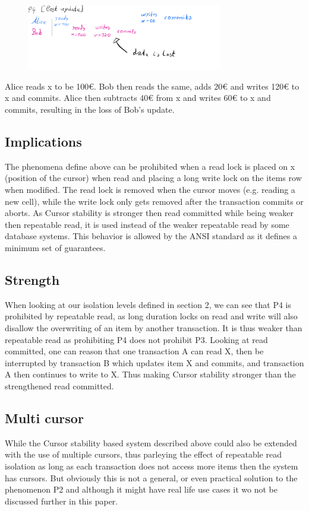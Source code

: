 \documentclass[sigconf, review=true]{acmart}
\begin{document}
\begin{figure}[h]
    
    \includegraphics[width=8.5cm]{P4}
    
\end{figure}

\begin{example}
    Alice reads x to be 100€. Bob then reads the same, adds 20€ and writes 120€ to x and commits.
    Alice then subtracts 40€ from x and writes 60€ to x and commits, resulting in the loss of Bob's update.
\end{example}
\subsection{Implications}
    The phenomena define above can be prohibited when a read lock is placed on x (position of the cursor) when
    read and placing a long write lock on the items row when modified.
    The read lock is removed when the cursor moves (e.g. reading a new cell),
    while the write lock only gets removed after the transaction commits or aborts.
    As Cursor stability is stronger then read committed while being weaker then repeatable read, it
    is used instead of the weaker repeatable read by some database systems. This behavior is allowed by the ANSI standard
    as it defines a minimum set of guarantees.
\subsection{Strength}
When looking at our isolation levels defined in section 2, we can see that P4 is prohibited by repeatable read,
as long duration locks on read and write will also disallow the overwriting of an item by another transaction.
It is thus weaker than repeatable read as prohibiting P4 does not prohibit P3.
Looking at read committed, one can reason that one transaction A can read X, then be interrupted by transaction B which updates
item X and commits, and transaction A then continues to write to X.
Thus making Cursor stability stronger than the strengthened read committed.
\subsection{Multi cursor}
While the Cursor stability based system described above could also be extended with the use of multiple cursors, thus
parleying the effect of repeatable read isolation as long as each transaction does not access more items
then the system has cursors. But obviously this is not a general, or even practical solution to the phenomenon P2 and
although it might have real life use cases it wo not be discussed further in this paper.
\end{document}
